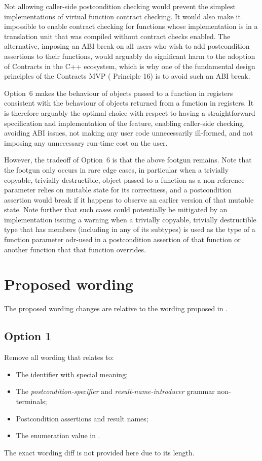 Not allowing caller-side postcondition checking would prevent the simplest implementations of virtual function contract checking.  It would also make it impossible to enable contract checking for functions whose implementation is in a translation unit that was compiled without contract checks enabled. The alternative, imposing an ABI break on all users who wish to add postcondition assertions to their functions, would arguably do significant harm to the adoption of Contracts in the C++ ecosystem, which is why one of the fundamental design principles of the Contracts MVP (\cite{P2900R10} Principle 16) is to avoid such an ABI break.

Option~6 makes the behaviour of objects passed to a function in registers consistent with the behaviour of objects returned from a function in registers. It is therefore arguably the optimal choice with respect to having a straightforward specification and implementation of the feature, enabling caller-side checking, avoiding ABI issues, not making any user code unnecessarily ill-formed, and not imposing any unnecessary run-time cost on the user.

However, the tradeoff of Option~6 is that the above footgun remains. Note that the footgun only occurs in rare edge cases, in particular when a trivially copyable, trivially destructible,  object passed to a function as a non-reference parameter relies on mutable state for its correctness, and a postcondition assertion would break if it happens to observe an earlier version of that mutable state. Note further that such cases could potentially be mitigated by an implementation issuing a warning when a trivially copyable, trivially destructible type that has  members (including in any of its subtypes) is used as the type of a function parameter odr-used in a postcondition assertion of that function or another function that that function overrides.

\section{Proposed wording}

The proposed wording changes are relative to the wording proposed in \cite{P2900R10}.

\subsection{Option 1}

Remove all wording that relates to:
\begin{itemize}
\item The  identifier with special meaning;
\item The \emph{postcondition-specifier} and \emph{result-name-introducer} grammar non-terminals;
\item Postcondition assertions and result names;
\item The  enumeration value in .
\end{itemize}
The exact wording diff is not provided here due to its length.

